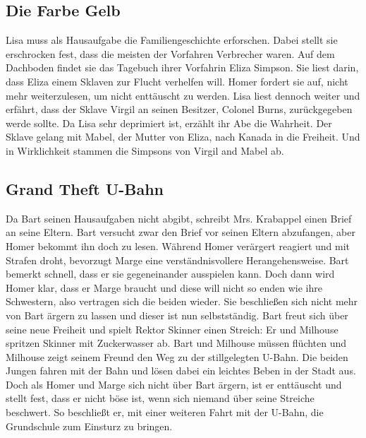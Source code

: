 \subsection{Die Farbe Gelb}
Lisa muss als Hausaufgabe die Familiengeschichte erforschen. Dabei stellt sie erschrocken fest, dass die meisten der Vorfahren Verbrecher waren. Auf dem Dachboden findet sie das Tagebuch ihrer Vorfahrin Eliza Simpson. Sie liest darin, dass Eliza einem Sklaven zur Flucht verhelfen will. Homer fordert sie auf, nicht mehr weiterzulesen, um nicht enttäuscht zu werden. Lisa liest dennoch weiter und erfährt, dass der Sklave Virgil an seinen Besitzer, Colonel Burns, zurückgegeben werde sollte. Da Lisa sehr deprimiert ist, erzählt ihr Abe die Wahrheit. Der Sklave gelang mit Mabel, der Mutter von Eliza, nach Kanada in die Freiheit. Und in Wirklichkeit stammen die Simpsons von Virgil and Mabel ab.


\subsection{Grand Theft U-Bahn }
Da Bart seinen Hausaufgaben nicht abgibt, schreibt Mrs. Krabappel einen Brief an seine Eltern. Bart versucht zwar den Brief vor seinen Eltern abzufangen, aber Homer bekommt ihn doch zu lesen. Während Homer verärgert reagiert und mit Strafen droht, bevorzugt Marge eine verständnisvollere Herangehensweise. Bart bemerkt schnell, dass er sie gegeneinander ausspielen kann. Doch dann wird Homer klar, dass er Marge braucht und diese will nicht so enden wie ihre Schwestern, also vertragen sich die beiden wieder. Sie beschließen sich nicht mehr von Bart ärgern zu lassen und dieser ist nun selbstständig. Bart freut sich über seine neue Freiheit und spielt Rektor Skinner einen Streich: Er und Milhouse spritzen Skinner mit Zuckerwasser ab. Bart und Milhouse müssen flüchten und Milhouse zeigt seinem Freund den Weg zu der stillgelegten U-Bahn. Die beiden Jungen fahren mit der Bahn und lösen dabei ein leichtes Beben in der Stadt aus. Doch als Homer und Marge sich nicht über Bart ärgern, ist er enttäuscht und stellt fest, dass er nicht böse ist, wenn sich niemand über seine Streiche beschwert. So beschließt er, mit einer weiteren Fahrt mit der U-Bahn, die Grundschule zum Einsturz zu bringen.

